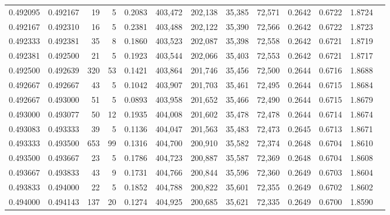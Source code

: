 \begin{tabular}{rrrrrrrrrrrrr}
0.492095 & 0.492167 &    19 &   5 &                                     0.2083 & 403,472 & 202,138 &  35,385 &  72,571 & 0.2642 & 0.6722 & 1.8724 \\
0.492167 & 0.492310 &    16 &   5 &                                     0.2381 & 403,488 & 202,122 &  35,390 &  72,566 & 0.2642 & 0.6722 & 1.8723 \\
0.492333 & 0.492381 &    35 &   8 &                                     0.1860 & 403,523 & 202,087 &  35,398 &  72,558 & 0.2642 & 0.6721 & 1.8719 \\
0.492381 & 0.492500 &    21 &   5 &                                     0.1923 & 403,544 & 202,066 &  35,403 &  72,553 & 0.2642 & 0.6721 & 1.8717 \\
0.492500 & 0.492639 &   320 &  53 &                                     0.1421 & 403,864 & 201,746 &  35,456 &  72,500 & 0.2644 & 0.6716 & 1.8688 \\
0.492667 & 0.492667 &    43 &   5 &                                     0.1042 & 403,907 & 201,703 &  35,461 &  72,495 & 0.2644 & 0.6715 & 1.8684 \\
0.492667 & 0.493000 &    51 &   5 &                                     0.0893 & 403,958 & 201,652 &  35,466 &  72,490 & 0.2644 & 0.6715 & 1.8679 \\
0.493000 & 0.493077 &    50 &  12 &                                     0.1935 & 404,008 & 201,602 &  35,478 &  72,478 & 0.2644 & 0.6714 & 1.8674 \\
0.493083 & 0.493333 &    39 &   5 &                                     0.1136 & 404,047 & 201,563 &  35,483 &  72,473 & 0.2645 & 0.6713 & 1.8671 \\
0.493333 & 0.493500 &   653 &  99 &                                     0.1316 & 404,700 & 200,910 &  35,582 &  72,374 & 0.2648 & 0.6704 & 1.8610 \\
0.493500 & 0.493667 &    23 &   5 &                                     0.1786 & 404,723 & 200,887 &  35,587 &  72,369 & 0.2648 & 0.6704 & 1.8608 \\
0.493667 & 0.493833 &    43 &   9 &                                     0.1731 & 404,766 & 200,844 &  35,596 &  72,360 & 0.2649 & 0.6703 & 1.8604 \\
0.493833 & 0.494000 &    22 &   5 &                                     0.1852 & 404,788 & 200,822 &  35,601 &  72,355 & 0.2649 & 0.6702 & 1.8602 \\
0.494000 & 0.494143 &   137 &  20 &                                     0.1274 & 404,925 & 200,685 &  35,621 &  72,335 & 0.2649 & 0.6700 & 1.8590 \\

\end{tabular}
